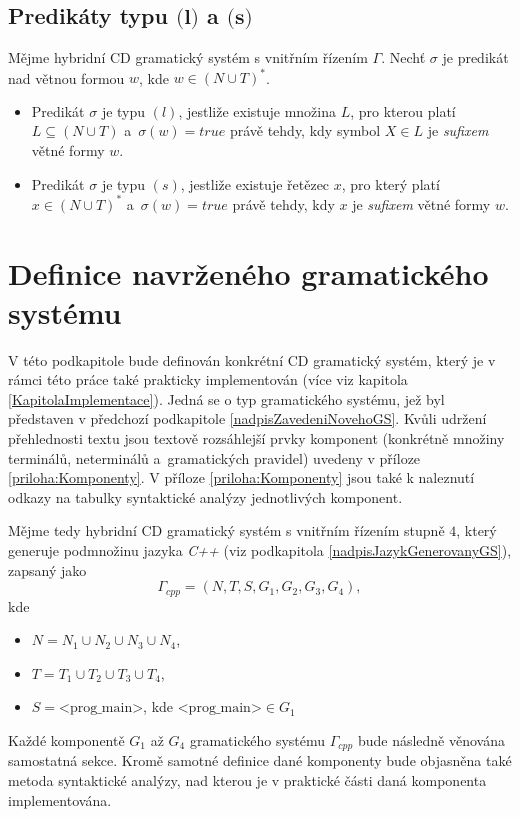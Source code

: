 \subsection*{Predikáty typu $\textbf{(l)}$ a $\textbf{(s)}$}
\begin{definice}
  Mějme hybridní CD gramatický systém s vnitřním řízením $\Gamma$. Nechť $\sigma$ je predikát nad větnou formou $w$, kde
  $w \in (N \cup T)^*$.
  \begin{itemize}
    \item Predikát $\sigma$ je typu $(l)$, jestliže existuje množina $L$, pro kterou platí $L \subseteq (N \cup T)$ a~$\sigma(w) = true$ právě tehdy, kdy
    symbol $X \in L$ je \emph{sufixem} větné formy $w$.
    \item Predikát $\sigma$ je typu $(s)$, jestliže existuje řetězec $x$, pro který platí $x \in (N \cup T)^*$ a~$\sigma(w) = true$ právě tehdy, kdy
    $x$ je \emph{sufixem} větné formy $w$.
  \end{itemize}
\end{definice}

\section{Definice navrženého gramatického systému} \label{NadpisDefiniceGSCpp}
V této podkapitole bude definován konkrétní CD gramatický systém, který je v rámci této práce také prakticky implementován (více viz kapitola \ref{KapitolaImplementace}).
Jedná se o typ gramatického systému, jež byl představen v předchozí podkapitole \ref{nadpisZavedeniNovehoGS}. Kvůli
udržení přehlednosti textu jsou textově rozsáhlejší prvky komponent (konkrétně množiny terminálů, neterminálů a~gramatických pravidel)
uvedeny v příloze \ref{priloha:Komponenty}. V příloze \ref{priloha:Komponenty} jsou také k naleznutí odkazy na tabulky syntaktické analýzy jednotlivých komponent.

Mějme tedy hybridní CD gramatický systém s vnitřním řízením stupně $4$, který generuje podmnožinu jazyka \emph{C++} (viz podkapitola \ref{nadpisJazykGenerovanyGS}), zapsaný jako
$$\Gamma_{cpp} = (N, T, S, G_1, G_2, G_3, G_4),$$ kde
\begin{itemize}
  \item $N = N_1 \cup N_2 \cup N_3 \cup N_4$,
  \item $T = T_1 \cup T_2 \cup T_3 \cup T_4$,
  \item $S = \text{<prog\_main>}$, kde $\text{<prog\_main>} \in G_1$
\end{itemize}
Každé komponentě $G_1$ až $G_4$ gramatického systému $\Gamma_{cpp}$ bude následně věnována samostatná sekce. Kromě samotné definice dané komponenty bude objasněna také
metoda syntaktické analýzy, nad kterou je v praktické části daná komponenta implementována.

